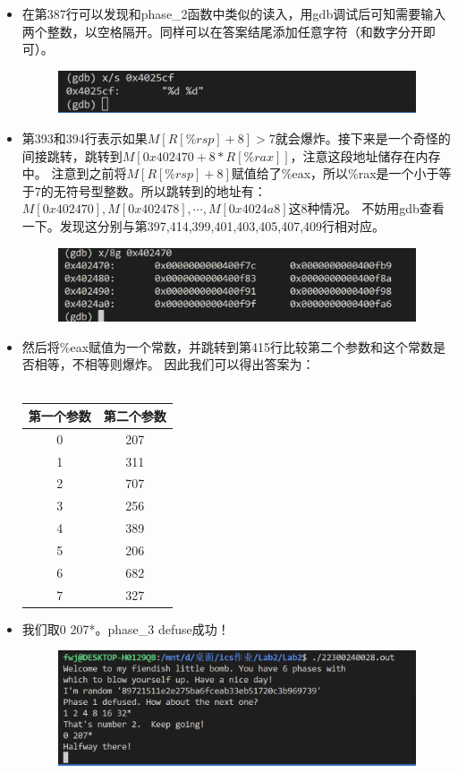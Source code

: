 \documentclass[12pt, a4paper, oneside]{ctexart}
\begin{document}
\begin{itemize}
    \item 在第387行可以发现和phase\_2函数中类似的读入，用gdb调试后可知需要输入两个整数，以空格隔开。同样可以在答案结尾添加任意字符（和数字分开即可）。
    \begin{figure}[htbp]
        \includegraphics[scale=0.5]{image/2.4-2.png}
    \end{figure}
    \item 第393和394行表示如果$M[R[\%rsp] + 8] > 7$就会爆炸。接下来是一个奇怪的间接跳转，跳转到$M[0x402470 + 8 * R[\%rax]]$，注意这段地址储存在内存中。
    注意到之前将$M[R[\%rsp] + 8]$赋值给了\%eax，所以\%rax是一个小于等于7的无符号型整数。所以跳转到的地址有：\\$M[0x402470], M[0x402478], \cdots, M[0x4024a8]$这8种情况。
    不妨用gdb查看一下。发现这分别与第397,414,399,401,403,405,407,409行相对应。
    \begin{figure}[htbp]
        \includegraphics[scale=0.5]{image/2.4-3.png}
    \end{figure}
    \item 然后将\%eax赋值为一个常数，并跳转到第415行比较第二个参数和这个常数是否相等，不相等则爆炸。
    因此我们可以得出答案为：\\
    \\
\begin{tabular}{cc}
    \toprule
    第一个参数 & 第二个参数\\
    \midrule
    0 & 207\\
    1 & 311\\
    2 & 707\\
    3 & 256\\
    4 & 389\\
    5 & 206\\
    6 & 682\\
    7 & 327\\
    \bottomrule
\end{tabular}
    \item 我们取0 207*。phase\_3 defuse成功！
\begin{figure}[htbp]
    \includegraphics[scale=0.4]{image/2.4-4.png}
\end{figure}
\end{itemize}
\end{document}
